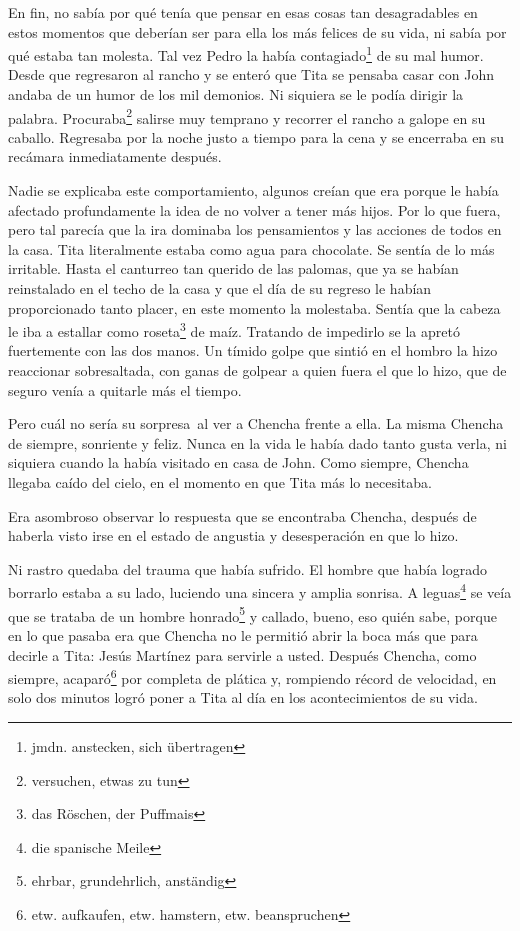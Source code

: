 En fin, no sabía por qué tenía que pensar en esas cosas tan
desagradables en estos momentos que deberían ser para ella los más
felices de su vida, ni sabía por qué estaba tan molesta. Tal vez Pedro
la había contagiado\footnote{jmdn. anstecken, sich übertragen}
de su mal humor. Desde que regresaron al rancho y se
enteró que Tita se pensaba casar con John andaba de un humor de los mil
demonios. Ni siquiera se le podía dirigir la palabra. Procuraba\footnote{versuchen, etwas zu tun} salirse
muy temprano y recorrer el rancho a galope en su caballo. Regresaba por
la noche justo a tiempo para la cena y se encerraba en su recámara
inmediatamente después.

Nadie se explicaba este comportamiento, algunos creían que era porque
le había afectado profundamente la idea de no volver a tener más hijos.
Por lo que fuera, pero tal parecía que la ira dominaba los pensamientos
y las acciones de todos en la casa. Tita literalmente estaba \glqq{}como agua
para chocolate\grqq{}. Se sentía de lo más irritable. Hasta el canturreo tan
querido de las palomas, que ya se habían reinstalado en el techo de la
casa y que el día de su regreso le habían proporcionado tanto placer, en
este momento la molestaba. Sentía que la cabeza le iba a estallar como roseta\footnote{das Röschen, der Puffmais} de maíz. Tratando de
impedirlo se la apretó fuertemente con las dos manos. Un tímido golpe
que sintió en el hombro la hizo reaccionar sobresaltada, con ganas de
golpear a quien fuera el que lo hizo, que de seguro venía a quitarle
más el tiempo.

Pero cuál no sería su sorpresa~al ver a Chencha frente a ella. La
misma Chencha de siempre, sonriente y feliz. Nunca en la vida le había
dado tanto gusta verla, ni siquiera cuando la había visitado en casa de
John. Como siempre, Chencha llegaba caído del cielo, en el momento en
que Tita más lo necesitaba.

Era asombroso observar lo respuesta que se encontraba Chencha, después
de haberla visto irse en el estado de angustia y desesperación en que lo
hizo.

Ni rastro quedaba del trauma que había sufrido. El hombre que había
logrado borrarlo estaba a su lado, luciendo una sincera y amplia
sonrisa. A leguas\footnote{die spanische Meile} se veía que se
trataba de un hombre honrado\footnote{ehrbar, grundehrlich, anständig}
y callado, bueno, eso quién sabe, porque en lo que pasaba era que Chencha
no le permitió abrir la boca más que para decirle a Tita: \glqq{}Jesús Martínez
para servirle a usted\grqq{}. Después Chencha, como siempre, acaparó\footnote{etw. aufkaufen, etw. hamstern, etw. beanspruchen}
por completa de plática y, rompiendo récord de velocidad, en solo dos
minutos logró poner a Tita al día en los acontecimientos de su vida.

